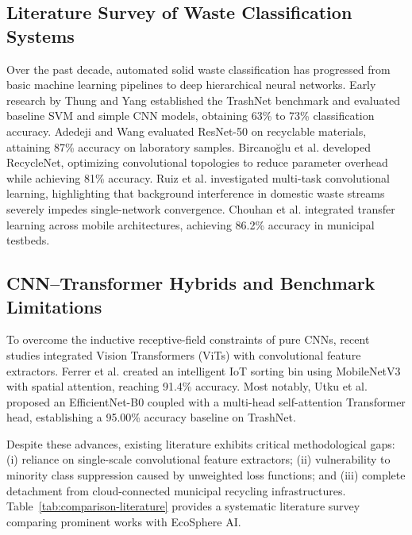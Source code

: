 \documentclass[11pt,a4paper]{article}
\begin{document}
\subsection{Literature Survey of Waste Classification Systems}
Over the past decade, automated solid waste classification has progressed from basic machine learning pipelines to deep hierarchical neural networks. Early research by Thung and Yang \cite{thung2016} established the TrashNet benchmark and evaluated baseline SVM and simple CNN models, obtaining 63\% to 73\% classification accuracy. Adedeji and Wang \cite{adedeji2019} evaluated ResNet-50 on recyclable materials, attaining 87\% accuracy on laboratory samples. Bircano\u{g}lu et al. \cite{bircanoglu2018} developed RecycleNet, optimizing convolutional topologies to reduce parameter overhead while achieving 81\% accuracy. Ruiz et al. \cite{ruiz2019} investigated multi-task convolutional learning, highlighting that background interference in domestic waste streams severely impedes single-network convergence. Chouhan et al. \cite{chouhan2020} integrated transfer learning across mobile architectures, achieving 86.2\% accuracy in municipal testbeds.

\subsection{CNN--Transformer Hybrids and Benchmark Limitations}
To overcome the inductive receptive-field constraints of pure CNNs, recent studies integrated Vision Transformers (ViTs) \cite{vaswani2017, dosovitskiy2020} with convolutional feature extractors. Ferrer et al. \cite{ferrer2025} created an intelligent IoT sorting bin using MobileNetV3 \cite{sandler2018} with spatial attention, reaching 91.4\% accuracy. Most notably, Utku et al. \cite{utku2026} proposed an EfficientNet-B0 coupled with a multi-head self-attention Transformer head, establishing a 95.00\% accuracy baseline on TrashNet. 

Despite these advances, existing literature exhibits critical methodological gaps: (i) reliance on single-scale convolutional feature extractors; (ii) vulnerability to minority class suppression caused by unweighted loss functions; and (iii) complete detachment from cloud-connected municipal recycling infrastructures. Table~\ref{tab:comparison-literature} provides a systematic literature survey comparing prominent works with EcoSphere AI.
\end{document}
